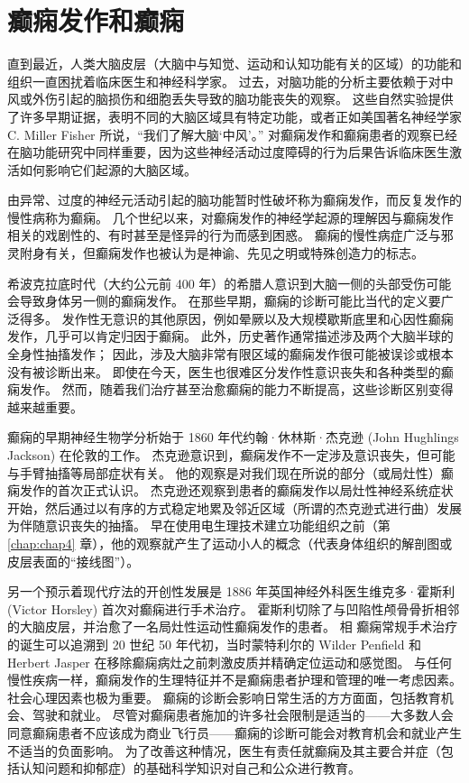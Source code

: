 \chapter{癫痫发作和癫痫} \label{chap:chap58}

直到最近，人类大脑皮层（大脑中与知觉、运动和认知功能有关的区域）的功能和组织一直困扰着临床医生和神经科学家。
过去，对脑功能的分析主要依赖于对中风或外伤引起的脑损伤和细胞丢失导致的脑功能丧失的观察。
这些自然实验提供了许多早期证据，表明不同的大脑区域具有特定功能，或者正如美国著名神经学家 C. Miller Fisher 所说，“我们了解大脑‘中风’。”
对癫痫发作和癫痫患者的观察已经 在脑功能研究中同样重要，因为这些神经活动过度障碍的行为后果告诉临床医生激活如何影响它们起源的大脑区域。


由异常、过度的神经元活动引起的脑功能暂时性破坏称为癫痫发作，而反复发作的慢性病称为癫痫。
几个世纪以来，对癫痫发作的神经学起源的理解因与癫痫发作相关的戏剧性的、有时甚至是怪异的行为而感到困惑。
癫痫的慢性病症广泛与邪灵附身有关，但癫痫发作也被认为是神谕、先见之明或特殊创造力的标志。


希波克拉底时代（大约公元前 400 年）的希腊人意识到大脑一侧的头部受伤可能会导致身体另一侧的癫痫发作。
在那些早期，癫痫的诊断可能比当代的定义要广泛得多。
发作性无意识的其他原因，例如晕厥以及大规模歇斯底里和心因性癫痫发作，几乎可以肯定归因于癫痫。
此外，历史著作通常描述涉及两个大脑半球的全身性抽搐发作；
因此，涉及大脑非常有限区域的癫痫发作很可能被误诊或根本没有被诊断出来。
即使在今天，医生也很难区分发作性意识丧失和各种类型的癫痫发作。
然而，随着我们治疗甚至治愈癫痫的能力不断提高，这些诊断区别变得越来越重要。


癫痫的早期神经生物学分析始于 1860 年代约翰·休林斯·杰克逊 (John Hughlings Jackson) 在伦敦的工作。
杰克逊意识到，癫痫发作不一定涉及意识丧失，但可能与手臂抽搐等局部症状有关。
他的观察是对我们现在所说的部分（或局灶性）癫痫发作的首次正式认识。
杰克逊还观察到患者的癫痫发作以局灶性神经系统症状开始，然后通过以有序的方式稳定地累及邻近区域（所谓的杰克逊式进行曲）发展为伴随意识丧失的抽搐。
早在使用电生理技术建立功能组织之前（第 \ref{chap:chap4} 章），他的观察就产生了运动小人的概念（代表身体组织的解剖图或皮层表面的“接线图”）。


另一个预示着现代疗法的开创性发展是 1886 年英国神经外科医生维克多·霍斯利 (Victor Horsley) 首次对癫痫进行手术治疗。
霍斯利切除了与凹陷性颅骨骨折相邻的大脑皮层，并治愈了一名局灶性运动性癫痫发作的患者。
相 癫痫常规手术治疗的诞生可以追溯到 20 世纪 50 年代初，当时蒙特利尔的 Wilder Penfield 和 Herbert Jasper 在移除癫痫病灶之前刺激皮质并精确定位运动和感觉图。
与任何慢性疾病一样，癫痫发作的生理特征并不是癫痫患者护理和管理的唯一考虑因素。
社会心理因素也极为重要。 癫痫的诊断会影响日常生活的方方面面，包括教育机会、驾驶和就业。
尽管对癫痫患者施加的许多社会限制是适当的——大多数人会同意癫痫患者不应该成为商业飞行员——癫痫的诊断可能会对教育机会和就业产生不适当的负面影响。
为了改善这种情况，医生有责任就癫痫及其主要合并症（包括认知问题和抑郁症）的基础科学知识对自己和公众进行教育。



